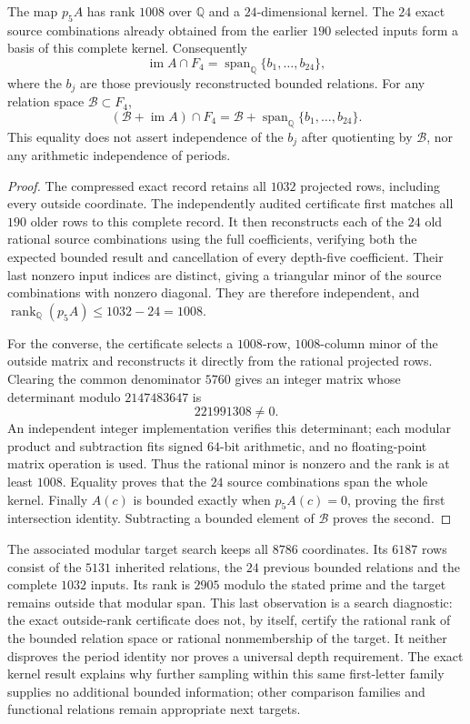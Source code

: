 \begin{theorem}
\label{fcd5:kernel}
The map $p_5A$ has rank $1008$ over $\mathbb Q$ and a
$24$-dimensional kernel.  The $24$ exact source combinations already
obtained from the earlier $190$ selected inputs form a basis of this
complete kernel.  Consequently
\[
 \operatorname{im}A\cap F_4
     =\operatorname{span}_{\mathbb Q}\{b_1,\ldots,b_{24}\},
\]
where the $b_j$ are those previously reconstructed bounded relations.
For any relation space $\mathcal B\subset F_4$,
\[
 (\mathcal B+\operatorname{im}A)\cap F_4
             =\mathcal B+\operatorname{span}_{\mathbb Q}\{b_1,\ldots,b_{24}\}.
\]
This equality does not assert independence of the $b_j$ after quotienting
by $\mathcal B$, nor any arithmetic independence of periods.
\end{theorem}

\begin{proof}
The compressed exact record retains all $1032$ projected rows, including
every outside coordinate.  The independently audited certificate
first matches all $190$ older rows to this complete record.  It then
reconstructs each of the $24$ old rational source combinations using
the full coefficients, verifying both the expected bounded result
and cancellation of every depth-five coefficient.  Their last nonzero
input indices are distinct, giving a triangular minor of the source
combinations with nonzero diagonal.  They are therefore independent,
and $\operatorname{rank}_{\mathbb Q}(p_5A)\le1032-24=1008$.

For the converse, the certificate selects a $1008$-row, $1008$-column
minor of the outside matrix and reconstructs it directly from the
rational projected rows.  Clearing the common denominator $5760$
gives an integer matrix whose determinant modulo $2147483647$ is
\[
 221991308\ne0.
\]
An independent integer implementation verifies this determinant;
each modular product and subtraction fits signed $64$-bit arithmetic,
and no floating-point matrix operation is used.  Thus the rational
minor is nonzero and the rank is at least $1008$.  Equality proves
that the $24$ source combinations span the whole kernel.
Finally $A(c)$ is bounded exactly when $p_5A(c)=0$, proving the first
intersection identity.  Subtracting a bounded element of $\mathcal B$
proves the second.
\end{proof}

The associated modular target search keeps all $8786$ coordinates.
Its $6187$ rows consist of the $5131$ inherited relations, the $24$
previous bounded relations and the complete $1032$ inputs.  Its rank
is $2905$ modulo the stated prime and the target remains outside that
modular span.  This last observation is a search diagnostic: the
exact outside-rank certificate does not, by itself, certify the rational
rank of the bounded relation space or rational nonmembership of the
target.  It neither disproves the period identity nor proves a universal
depth requirement.  The exact kernel result explains why further
sampling within this same first-letter family supplies no additional
bounded information; other comparison families and functional relations
remain appropriate next targets.
